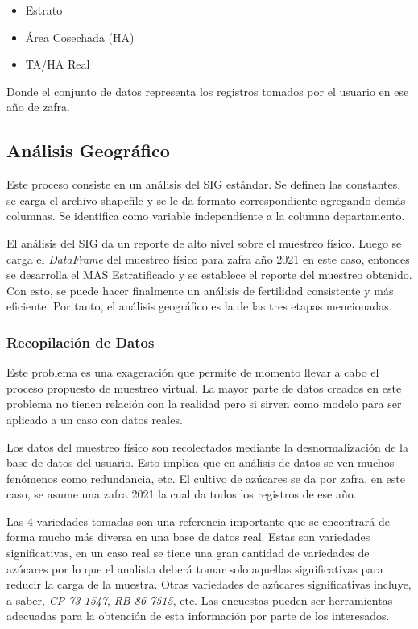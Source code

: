 \documentclass{article}
\begin{document}
\begin{itemize}
    \item Estrato
    \item Área Cosechada (HA)
    \item TA/HA Real
\end{itemize}

Donde el conjunto de datos representa los registros tomados por el usuario en ese año de zafra.

\subsection{Análisis Geográfico}

Este proceso consiste en un análisis del SIG estándar. Se definen las constantes, se carga el archivo shapefile y se le da formato correspondiente agregando demás columnas. Se identifica como variable independiente a la columna departamento.

\bigbreak

El análisis del SIG da un reporte de alto nivel sobre el muestreo físico. Luego se carga el \textit{DataFrame} del muestreo físico para zafra año 2021 en este caso, entonces se desarrolla el MAS Estratificado y se establece el reporte del muestreo obtenido. Con esto, se puede hacer finalmente un análisis de fertilidad consistente y más eficiente. Por tanto, el análisis geográfico es la de las tres etapas mencionadas.

\subsubsection{Recopilación de Datos}

Este problema es una exageración que permite de momento llevar a cabo el proceso propuesto de muestreo virtual. La mayor parte de datos creados en este problema no tienen relación con la realidad pero si sirven como modelo para ser aplicado a un caso con datos reales.

\bigbreak

Los datos del muestreo físico son recolectados mediante la desnormalización de la base de datos del usuario. Esto implica que en análisis de datos se ven muchos fenómenos como redundancia, etc. El cultivo de azúcares se da por zafra, en este caso, se asume una zafra 2021 la cual da todos los registros de ese año.

\bigbreak

Las 4 \href{https://www.gob.mx/conadesuca/es/articulos/variedades-de-cana-de-azucar?idiom=es}{variedades} tomadas son una referencia importante que se encontrará de forma mucho más diversa en una base de datos real. Estas son variedades significativas, en un caso real se tiene una gran cantidad de variedades de azúcares por lo que el analista deberá tomar solo aquellas significativas para reducir la carga de la muestra. Otras variedades de azúcares significativas incluye, a saber, \textit{CP 73-1547}, \textit{RB 86-7515}, etc. Las encuestas pueden ser herramientas adecuadas para la obtención de esta información por parte de los interesados.
\end{document}
